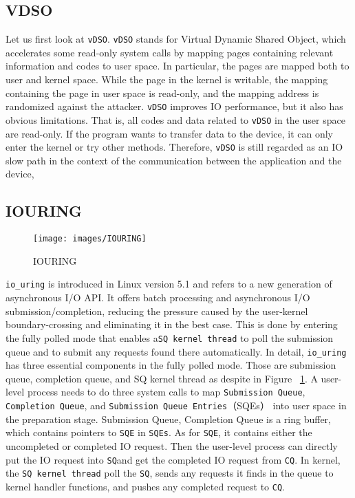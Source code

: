 \subsection{VDSO}

Let us first look at \verb|vDSO|. \verb|vDSO| stands for Virtual Dynamic Shared Object, 
which accelerates some read-only system calls by mapping pages containing 
relevant information and codes to user space. In particular, the pages are 
mapped both to user and kernel space. While the page in the kernel is writable, 
the mapping containing the page in user space is read-only, 
and the mapping address is randomized against the attacker.  
\verb|vDSO| improves IO performance, but it also has obvious limitations. 
That is, all codes and data related to \verb|vDSO| in the user space are read-only. 
If the program wants to transfer data to the device, it can only enter the 
kernel or try other methods. Therefore, \verb|vDSO| is still regarded as an 
IO slow path in the context of the communication  between the application 
and the device,
\subsection{IOURING}
\begin{figure}[tbp]
  \centering
  \texttt{[image: images/IOURING]}
  \caption[Short description]{IOURING}
  \label{fig:IOURING}
\end{figure}
\verb|io_uring| is introduced in Linux version 
5.1 and refers to a new generation of asynchronous 
I/O API. It offers batch processing and asynchronous 
I/O submission/completion,  reducing the pressure caused 
by the user-kernel boundary-crossing and eliminating 
it in the best case. This is done by entering the fully 
polled mode that enables a\verb|SQ kernel thread| to poll the 
submission queue and to submit any requests found there 
automatically.   In detail, \verb|io_uring| has three essential 
components in the fully polled mode. Those are submission queue, 
completion queue, and SQ kernel thread as despite in Figure 
~\ref{fig:IOURING}.  A user-level process needs to do three system calls 
to map \verb|Submission Queue|, \verb|Completion Queue|, and 
\verb|Submission Queue Entries|（SQEs）
into user space in the preparation stage. Submission Queue, 
Completion Queue is a ring buffer, which contains pointers to 
\verb|SQE| in \verb|SQEs|. As for \verb|SQE|, it contains either the uncompleted or completed 
IO request. Then the user-level process can directly put the IO request 
into \verb|SQ|and get the completed IO request from \verb|CQ|. In kernel, 
the \verb|SQ kernel thread| poll the \verb|SQ|, sends any requests it finds in the queue 
to kernel handler functions, and pushes any completed request to \verb|CQ|. 

